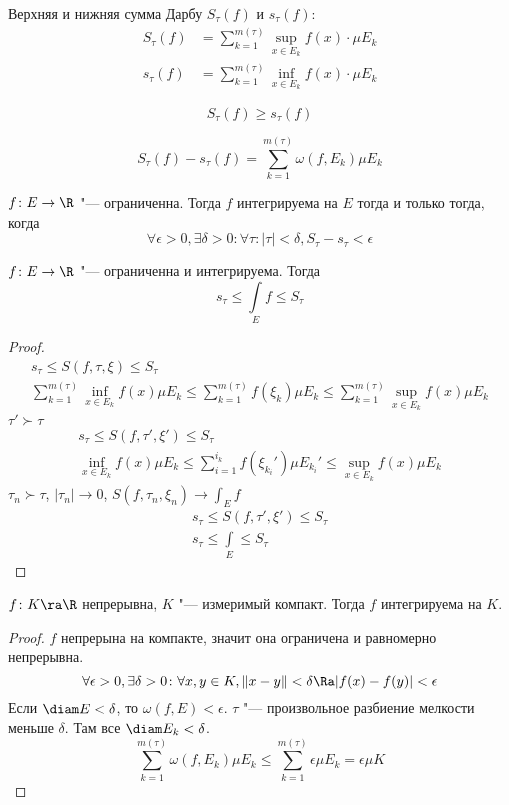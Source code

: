\begin{Def}
	Верхняя и нижняя сумма Дарбу $S_\tau(f)$ и $s_\tau(f)$:
	\begin{align*}
		S_\tau(f) &= \sum_{k=1}^{m(\tau)} \sup_{x \in E_k} f(x) \cdot \mu E_k \\
		s_\tau(f) &= \sum_{k=1}^{m(\tau)} \inf_{x \in E_k} f(x) \cdot \mu E_k
	\end{align*}
\end{Def}
\begin{Rem}
	\[ S_\tau(f) \ge s_\tau(f) \]
\end{Rem}
\begin{Rem}
	\[ S_\tau(f) - s_\tau(f) = \sum_{k=1}^{m(\tau)} \omega(f, E_k) \mu E_k \]
\end{Rem}

\begin{theorem}
	$f\colon E \to \R$ "--- ограниченна.
	Тогда $f$ интегрируема на $E$ тогда и только тогда, когда
	\[ \forall \epsilon > 0, \exists \delta > 0\colon \forall \tau\colon |\tau| < \delta, S_\tau - s_\tau < \epsilon \]
\end{theorem}

\begin{conseq}
	$f\colon E \to \R$ "--- ограниченна и интегрируема.
	Тогда
	\[ s_\tau \le \int\limits_E f \le S_\tau \]
\end{conseq}
\begin{proof}
	\begin{gather*}
		s_\tau \le S(f, \tau, \xi) \le S_\tau \\
		\sum_{k=1}^{m(\tau)} \inf_{x \in E_k} f(x) \mu E_k
			\le \sum_{k=1}^{m(\tau)} f(\xi_k) \mu E_k
			\le \sum_{k=1}^{m(\tau)} \sup_{x \in E_k} f(x) \mu E_k
	\end{gather*}
	$\tau' \succ \tau$
	\begin{gather*}
		s_\tau \le S(f, \tau', \xi') \le S_\tau \\
		\inf_{x \in E_k} f(x) \mu E_k
			\le \sum_{i=1}^{i_k} f(\xi_{k_i}') \mu E_{k_i}'
			\le \sup_{x \in E_k} f(x) \mu E_k
	\end{gather*}
	$\tau_n \succ \tau$, $|\tau_n| \to 0$, $S(f, \tau_n, \xi_n) \to \int_E f$
	\begin{gather*}
		s_\tau \le S(f, \tau', \xi') \le S_\tau \\
		s_\tau \le \int\limits_E \le S_\tau
	\end{gather*}
\end{proof}

\begin{theorem}
	$f\colon K \ra \R$ непрерывна, $K$ "--- измеримый компакт.
	Тогда $f$ интегрируема на $K$.
\end{theorem}
\begin{proof}
	$f$ непрерына на компакте, значит она ограничена и равномерно непрерывна.
	\[ \forall \epsilon > 0, \exists \delta > 0\colon \forall x,y\in K, \|x - y\| < \delta \Ra |f(x) - f(y)| < \epsilon \]
	Если $\diam E < \delta$, то $\omega(f, E) < \epsilon$.
	$\tau$ "--- произвольное разбиение мелкости меньше $\delta$. Там все $\diam E_k < \delta$.
	\[ \sum_{k=1}^{m(\tau)} \omega(f, E_k) \mu E_k \le \sum_{k=1}^{m(\tau)} \epsilon \mu E_k = \epsilon \mu K \]
\end{proof}

